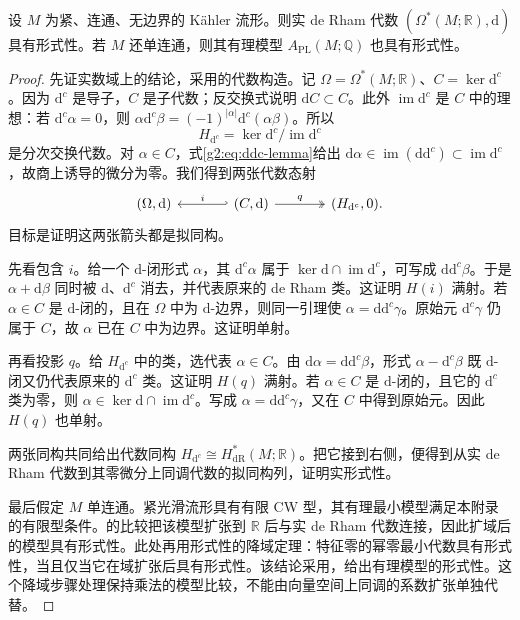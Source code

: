 \begin{theorem}\label{g2:thm:kahler-formality}
	设 \(M\) 为紧、连通、无边界的 Kähler 流形。则实 de Rham 代数 \((\Omega^*(M;\mathbb R),\mathrm d)\) 具有形式性。若 \(M\) 还单连通，则其有理模型 \(A_{\mathrm{PL}}(M;\mathbb Q)\) 也具有形式性。
\end{theorem}
\begin{proof}
	先证实数域上的结论，采用\cite[第6节，第一种证明，第270—271页]{DeligneGriffithsMorganSullivan1975}的代数构造。记 \(\Omega=\Omega^*(M;\mathbb R)\)、\(C=\ker\mathrm d^c\)。因为 \(\mathrm d^c\) 是导子，\(C\) 是子代数；反交换式说明 \(\mathrm dC\subset C\)。此外 \(\operatorname{im}\mathrm d^c\) 是 \(C\) 中的理想：若 \(\mathrm d^c\alpha=0\)，则 \(\alpha\mathrm d^c\beta=(-1)^{|\alpha|}\mathrm d^c(\alpha\beta)\)。所以
	\[
		H_{\mathrm d^c}=\ker\mathrm d^c/\operatorname{im}\mathrm d^c
	\]
	是分次交换代数。对 \(\alpha\in C\)，式\eqref{g2:eq:ddc-lemma}给出 \(\mathrm d\alpha\in\operatorname{im}(\mathrm d\mathrm d^c)\subset\operatorname{im}\mathrm d^c\)，故商上诱导的微分为零。我们得到两张代数态射
	\[
		\begin{tikzcd}[column sep=large]
			(\Omega,\mathrm d)&(C,\mathrm d)\arrow[l,hook',"i"']\arrow[r,two heads,"q"]&(H_{\mathrm d^c},0).
		\end{tikzcd}
	\]
	目标是证明这两张箭头都是拟同构。

	先看包含 \(i\)。给一个 \(\mathrm d\)-闭形式 \(\alpha\)，其 \(\mathrm d^c\alpha\) 属于 \(\ker\mathrm d\cap\operatorname{im}\mathrm d^c\)，可写成 \(\mathrm d\mathrm d^c\beta\)。于是 \(\alpha+\mathrm d\beta\) 同时被 \(\mathrm d\)、\(\mathrm d^c\) 消去，并代表原来的 de Rham 类。这证明 \(H(i)\) 满射。若 \(\alpha\in C\) 是 \(\mathrm d\)-闭的，且在 \(\Omega\) 中为 \(\mathrm d\)-边界，则同一引理使 \(\alpha=\mathrm d\mathrm d^c\gamma\)。原始元 \(\mathrm d^c\gamma\) 仍属于 \(C\)，故 \(\alpha\) 已在 \(C\) 中为边界。这证明单射。

	再看投影 \(q\)。给 \(H_{\mathrm d^c}\) 中的类，选代表 \(\alpha\in C\)。由 \(\mathrm d\alpha=\mathrm d\mathrm d^c\beta\)，形式 \(\alpha-\mathrm d^c\beta\) 既 \(\mathrm d\)-闭又仍代表原来的 \(\mathrm d^c\) 类。这证明 \(H(q)\) 满射。若 \(\alpha\in C\) 是 \(\mathrm d\)-闭的，且它的 \(\mathrm d^c\) 类为零，则 \(\alpha\in\ker\mathrm d\cap\operatorname{im}\mathrm d^c\)。写成 \(\alpha=\mathrm d\mathrm d^c\gamma\)，又在 \(C\) 中得到原始元。因此 \(H(q)\) 也单射。

	两张同构共同给出代数同构 \(H_{\mathrm d^c}\cong H^*_{\mathrm{dR}}(M;\mathbb R)\)。把它接到右侧，便得到从实 de Rham 代数到其零微分上同调代数的拟同构列，证明实形式性。

	最后假定 \(M\) 单连通。紧光滑流形具有有限 CW 型，其有理最小模型满足本附录的有限型条件。的比较把该模型扩张到 \(\mathbb R\) 后与实 de Rham 代数连接，因此扩域后的模型具有形式性。此处再用形式性的降域定理：特征零的幂零最小代数具有形式性，当且仅当它在域扩张后具有形式性。该结论采用\cite[第12节，定理12.1，第316页；证明说明见第319页]{Sullivan1977Infinitesimal}，给出有理模型的形式性。这个降域步骤处理保持乘法的模型比较，不能由向量空间上同调的系数扩张单独代替。
\end{proof}


